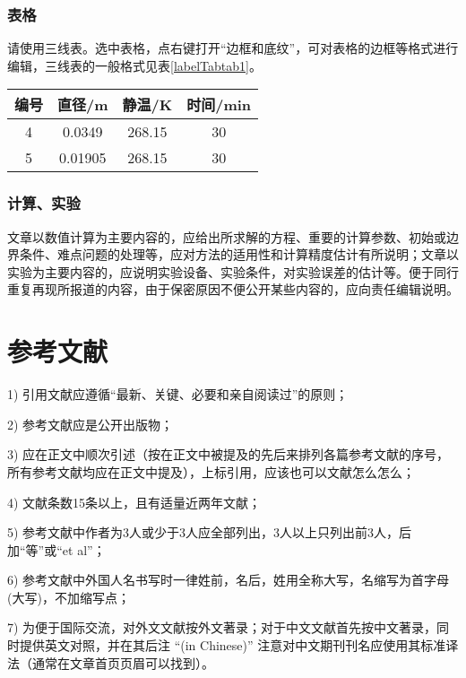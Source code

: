 \documentclass[10.5pt,twocolumn]{aaas}
\begin{document}
\subsubsection{表格}
请使用三线表。选中表格，点右键打开``边框和底纹”，可对表格的边框等格式进行编辑，三线表的一般格式见表\ref{labelTabtab1}。
\begin{table}[h]
\centering
\captionnamefont{\xiaowuhao\bf }
\captiontitlefont{\xiaowuhao\bf }
\renewcommand\tabcolsep{1em}
\begin{tabular}{cccc}
\toprule
{编号} &  {直径}/\si{\metre} & {静温}/\si{\kelvin} & {时间}/min\\
\midrule 
4 & 0.0349 & 268.15 & 30\\
5 & 0.01905 & 268.15 & 30\\
\bottomrule
\end{tabular}
\end{table}

\subsubsection{计算、实验}
文章以数值计算为主要内容的，应给出所求解的方程、重要的计算参数、初始或边界条件、难点问题的处理等，应对方法的适用性和计算精度估计有所说明；文章以实验为主要内容的，应说明实验设备、实验条件，对实验误差的估计等。便于同行重复再现所报道的内容，由于保密原因不便公开某些内容的，应向责任编辑说明。

\section{参考文献}
1) 引用文献应遵循``最新、关键、必要和亲自阅读过”的原则；

2) 参考文献应是公开出版物；

3) 应在正文中顺次引述（按在正文中被提及的先后来排列各篇参考文献的序号，所有参考文献均应在正文中提及），上标引用，应该也可以文献\cite{He2017A}怎么怎么；

4) 文献条数15条以上，且有适量近两年文献；

5) 参考文献中作者为3人或少于3人应全部列出，3人以上只列出前3人，后加``等”或``et al”；

6) 参考文献中外国人名书写时一律姓前，名后，姓用全称大写，名缩写为首字母(大写)，不加缩写点；

7) 为便于国际交流，对外文文献按外文著录；对于中文文献首先按中文著录，同时提供英文对照，并在其后注 ``(in Chinese)” 注意对中文期刊刊名应使用其标准译法（通常在文章首页页眉可以找到）。
\end{document}
